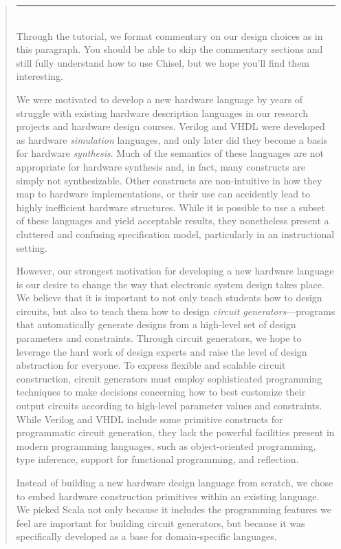 \documentclass[10pt]{article}
\newenvironment{commentary}
{ \vspace{-0.1in}
  \begin{quotation}
  \noindent
  \small \em
  \rule{\linewidth}{1pt}\\
}
{
  \end{quotation}
}
\begin{document}
\begin{commentary}
Through the tutorial, we format commentary on our design choices as in
this paragraph.  You should be able to skip the commentary sections
and still fully understand how to use Chisel, but we hope you'll find
them interesting.

We were motivated to develop a new hardware language by years of
struggle with existing hardware description languages in our research
projects and hardware design courses.  Verilog and VHDL were developed
as hardware {\em simulation} languages, and only later did they become
a basis for hardware {\em synthesis}.  Much of the semantics of these
languages are not appropriate for hardware synthesis and, in fact,
many constructs are simply not synthesizable.  Other constructs are
non-intuitive in how they map to hardware implementations, or their
use can accidently lead to highly inefficient hardware structures.
While it is possible to use a subset of these languages and yield
acceptable results, they nonetheless present a cluttered and confusing
specification model, particularly in an instructional setting.

However, our strongest motivation for developing a new hardware
language is our desire to change the way that electronic system design
takes place.  We believe that it is important to not only teach
students how to design circuits, but also to teach them how to design
{\em circuit generators}---programs that automatically generate
designs from a high-level set of design parameters and constraints.
Through circuit generators, we hope to leverage the hard work of
design experts and raise the level of design abstraction for everyone.
To express flexible and scalable circuit construction, circuit
generators must employ sophisticated programming techniques to make
decisions concerning how to best customize their output circuits
according to high-level parameter values and constraints.  While
Verilog and VHDL include some primitive constructs for programmatic
circuit generation, they lack the powerful facilities present in
modern programming languages, such as object-oriented programming,
type inference, support for functional programming, and reflection.

Instead of building a new hardware design language from scratch, we
chose to embed hardware construction primitives within an existing
language.  We picked Scala not only because it includes the
programming features we feel are important for building circuit
generators, but because it was specifically developed as a base for
domain-specific languages.
\end{commentary}
\end{document}
